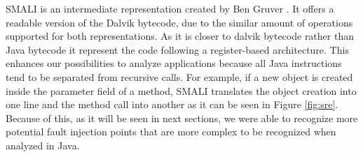 SMALI is an intermediate representation created by Ben Gruver \cite{smali}. It offers a readable version of the Dalvik bytecode, due to the similar amount of operations supported for both representations. As it is closer to dalvik bytecode rather than Java bytecode it represent the code following a register-based architecture. This enhances our possibilities to analyze applications because all Java instructions tend to be separated from recursive calls. For example, if a new object is created inside the parameter field of a method, SMALI translates the object creation into one line and the method call into another as it can be seen in Figure \ref{fig:sre}. Because of this, as it will be seen in next sections, we were able to recognize more potential fault injection points that are more complex to be recognized when analyzed in Java.


